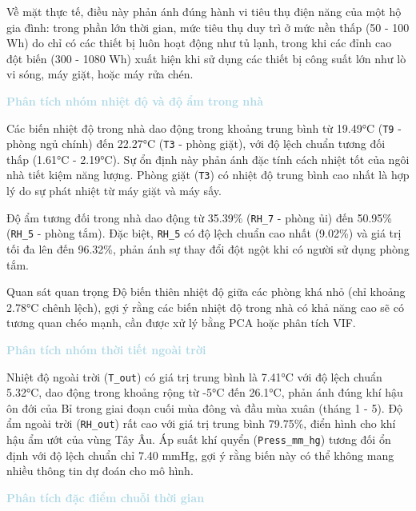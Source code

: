Về mặt thực tế, điều này phản ánh đúng hành vi tiêu thụ điện năng của một hộ gia đình: trong phần lớn thời gian, mức tiêu thụ duy trì ở mức nền thấp (50 - 100 Wh) do chỉ có các thiết bị luôn hoạt động như tủ lạnh, trong khi các đỉnh cao đột biến (300 - 1080 Wh) xuất hiện khi sử dụng các thiết bị công suất lớn như lò vi sóng, máy giặt, hoặc máy rửa chén.

\vspace{0.5em}
\noindent\textcolor{lightblue}{\textbf{Phân tích nhóm nhiệt độ và độ ẩm trong nhà}}
\vspace{0.5em}

Các biến nhiệt độ trong nhà dao động trong khoảng trung bình từ 19.49°C (\texttt{T9} - phòng ngủ chính) đến 22.27°C (\texttt{T3} - phòng giặt), với độ lệch chuẩn tương đối thấp (1.61°C - 2.19°C). Sự ổn định này phản ánh đặc tính cách nhiệt tốt của ngôi nhà tiết kiệm năng lượng. Phòng giặt (\texttt{T3}) có nhiệt độ trung bình cao nhất là hợp lý do sự phát nhiệt từ máy giặt và máy sấy.

Độ ẩm tương đối trong nhà dao động từ 35.39\% (\texttt{RH\_7} - phòng ủi) đến 50.95\% (\texttt{RH\_5} - phòng tắm). Đặc biệt, \texttt{RH\_5} có độ lệch chuẩn cao nhất (9.02\%) và giá trị tối đa lên đến 96.32\%, phản ánh sự thay đổi đột ngột khi có người sử dụng phòng tắm.

\begin{notebox}{Quan sát quan trọng}
Độ biến thiên nhiệt độ giữa các phòng khá nhỏ (chỉ khoảng 2.78°C chênh lệch), gợi ý rằng các biến nhiệt độ trong nhà có khả năng cao sẽ có tương quan chéo mạnh, cần được xử lý bằng PCA hoặc phân tích VIF.
\end{notebox}

\vspace{0.5em}
\noindent\textcolor{lightblue}{\textbf{Phân tích nhóm thời tiết ngoài trời}}
\vspace{0.5em}

Nhiệt độ ngoài trời (\texttt{T\_out}) có giá trị trung bình là 7.41°C với độ lệch chuẩn 5.32°C, dao động trong khoảng rộng từ -5°C đến 26.1°C, phản ánh đúng khí hậu ôn đới của Bỉ trong giai đoạn cuối mùa đông và đầu mùa xuân (tháng 1 - 5). Độ ẩm ngoài trời (\texttt{RH\_out}) rất cao với giá trị trung bình 79.75\%, điển hình cho khí hậu ẩm ướt của vùng Tây Âu. Áp suất khí quyển (\texttt{Press\_mm\_hg}) tương đối ổn định với độ lệch chuẩn chỉ 7.40 mmHg, gợi ý rằng biến này có thể không mang nhiều thông tin dự đoán cho mô hình.

\vspace{0.5em}
\noindent\textcolor{lightblue}{\textbf{Phân tích đặc điểm chuỗi thời gian}}
\vspace{0.5em}

